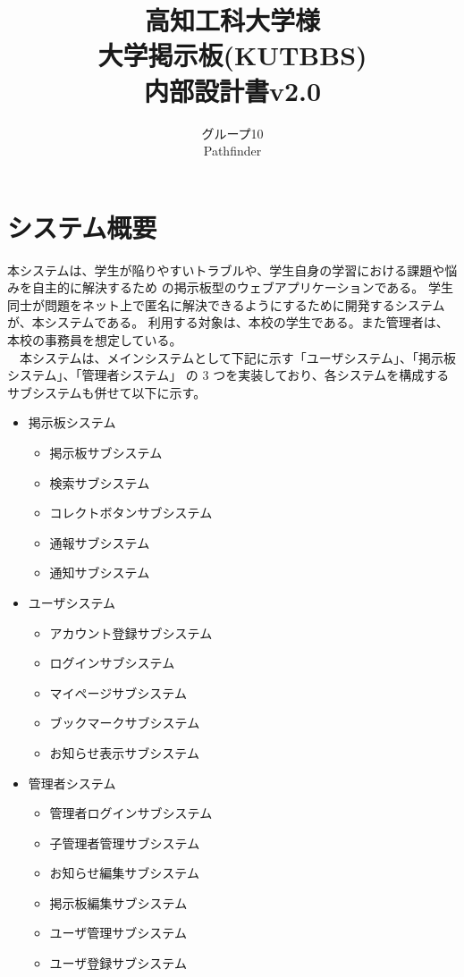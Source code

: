 \documentclass[a4j]{jarticle}
\title{
\vspace{30mm}
{\bf 高知工科大学様}\\
\vspace{5mm}
大学掲示板(KUTBBS)\\
\vspace{5mm}
{\bf  内部設計書v2.0}
\vspace{90mm}
}
\author{
\vspace{5mm}
グループ10 \\
\vspace{5mm}
Pathfinder \\
\vspace{5mm}
\vspace{10mm}
}
\begin{document}
\maketitle
\newpage
\tableofcontents
\newpage


 \section{システム概要}
本システムは、学生が陥りやすいトラブルや、学生自身の学習における課題や悩みを自主的に解決するため の掲示板型のウェブアプリケーションである。 学生同士が問題をネット上で匿名に解決できるようにするために開発するシステムが、本システムである。 利用する対象は、本校の学生である。また管理者は、本校の事務員を想定している。\\
　本システムは、メインシステムとして下記に示す「ユーザシステム」、「掲示板システム」、「管理者システム」 の 3 つを実装しており、各システムを構成するサブシステムも併せて以下に示す。
\begin{itemize}
\item 掲示板システム
	\begin{itemize}
	\item 掲示板サブシステム
	\item 検索サブシステム
	\item コレクトボタンサブシステム
	\item 通報サブシステム
	\item 通知サブシステム
	\end{itemize}
\item ユーザシステム
	\begin{itemize}
	\item アカウント登録サブシステム
	\item ログインサブシステム
	\item マイページサブシステム
	\item ブックマークサブシステム
	\item お知らせ表示サブシステム
	\end{itemize}
\item 管理者システム
	\begin{itemize}
	\item 管理者ログインサブシステム
	\item 子管理者管理サブシステム
	\item お知らせ編集サブシステム
	\item 掲示板編集サブシステム
	\item ユーザ管理サブシステム
  \item ユーザ登録サブシステム
	\end{itemize}
\end{itemize}
\end{document}
